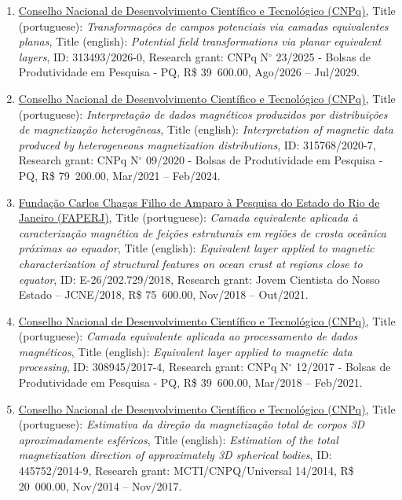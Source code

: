 \documentclass[11pt,a4paper,onecolumn]{article}
\newcommand{\FundingEntry}[9]{
	\noindent #1, Title (#2): \textit{#3}, Title (#4): \textit{#5}, ID: #6, Research grant: #7, R\$ #8, #9.}
\begin{document}
\begin{enumerate}[leftmargin=*, label=\textbf{(\arabic*)}]
	
	\item\FundingEntry{\href{https://cnpq.br/pagina-inicial}{Conselho Nacional de Desenvolvimento Cient{\' i}fico e Tecnol\'{o}gico (CNPq)}}{portuguese}{Transforma{\c c}{\~ o}es de campos potenciais via camadas equivalentes planas}{english}{Potential field transformations via planar equivalent layers}{313493/2026-0}{CNPq N$^{\circ}$ 23/2025 - Bolsas de Produtividade em Pesquisa - PQ}{39~600.00}{Ago/2026 -- Jul/2029}
	
	\item\FundingEntry{\href{https://cnpq.br/pagina-inicial}{Conselho Nacional de Desenvolvimento Cient{\' i}fico e Tecnol\'{o}gico (CNPq)}}{portuguese}{Interpreta{\c c}{\~ a}o de dados magn{\'e}ticos produzidos por distribui{\c c}{\~o}es de magnetiza{\c c}{\~a}o heterog{\^e}neas}{english}{Interpretation of magnetic data produced by heterogeneous magnetization distributions}{315768/2020-7}{CNPq N$^{\circ}$ 09/2020 - Bolsas de Produtividade em Pesquisa - PQ}{79~200.00}{Mar/2021 -- Feb/2024}

	\item\FundingEntry{\href{https://www.faperj.br/}{Funda\c{c}\~{a}o Carlos Chagas Filho de Amparo \`{a} Pesquisa do Estado do Rio de Janeiro (FAPERJ)}}{portuguese}{Camada equivalente aplicada {\` a}  caracteriza{\c c}{\~ a}o magn{\' e}tica de fei{\c c}{\~ o}es estruturais em regi{\~ o}es de  crosta oce{\^ a}nica pr{\' o}ximas ao equador}{english}{Equivalent layer applied to magnetic characterization of structural features on ocean crust at regions close to equator}{E-26/202.729/2018}{Jovem Cientista do Nosso Estado – JCNE/2018}{75~600.00}{Nov/2018 -- Out/2021}
	
	\item\FundingEntry{\href{https://cnpq.br/pagina-inicial}{Conselho Nacional de Desenvolvimento Cient{\' i}fico e Tecnol\'{o}gico (CNPq)}}{portuguese}{Camada equivalente aplicada ao processamento de dados magn{\' e}ticos}{english}{Equivalent layer applied to magnetic data processing}{308945/2017-4}{CNPq N$^{\circ}$ 12/2017 - Bolsas de Produtividade em Pesquisa - PQ}{39~600.00}{Mar/2018 -- Feb/2021}
	
	\item\FundingEntry{\href{https://cnpq.br/pagina-inicial}{Conselho Nacional de Desenvolvimento Cient\'{i}fico e Tecnol\'{o}gico (CNPq)}}{portuguese}{Estimativa da dire\c{c}\~{a}o da magnetiza\c{c}\~{a}o total de corpos 3D aproximadamente esf\'{e}ricos}{english}{Estimation of the total magnetization direction of approximately 3D spherical bodies}{445752/2014-9}{MCTI/CNPQ/Universal 14/2014}{20~000.00}{Nov/2014 -- Nov/2017}
	

\end{enumerate}
\end{document}
